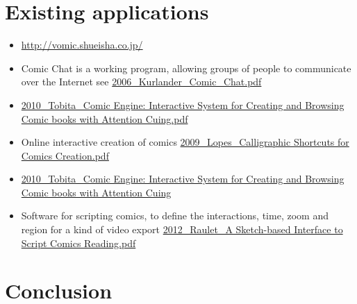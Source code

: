 
\section{Existing applications}
\label{sec:sota:applications}

\begin{itemize}
	\item \url{http://vomic.shueisha.co.jp/}
	\item Comic Chat is a working program, allowing groups of people to communicate over the Internet see \url{2006_Kurlander_Comic_Chat.pdf}
	\item \url{2010_Tobita_Comic Engine: Interactive System for Creating and Browsing Comic books with Attention Cuing.pdf}
	\item Online interactive creation of comics \url{2009_Lopes_Calligraphic Shortcuts for Comics Creation.pdf}
	\item \url{2010_Tobita_Comic Engine: Interactive System for Creating and Browsing Comic books with Attention Cuing}
	\item Software for scripting comics, to define the interactions, time, zoom and region for a kind of video export \url{2012_Raulet_A Sketch-based Interface to Script Comics Reading.pdf}
\end{itemize}

\section{Conclusion}
\label{sec:sota:conclusion}


